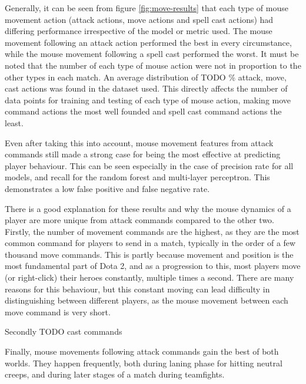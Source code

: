 \documentclass[Report.tex]{subfiles}
\begin{document}
Generally, it can be seen from figure \ref{fig:move-results} that each type of mouse movement action (attack actions, move actions and spell cast actions) had differing performance irrespective of the model or metric used. The mouse movement following an attack action performed the best in every circumstance, while the mouse movement following a spell cast performed the worst. It must be noted that the number of each type of mouse action were not in proportion to the other types in each match. An average distribution of TODO \% attack, move, cast actions was found in the dataset used. This directly affects the number of data points for training and testing of each type of mouse action, making move command actions the most well founded and spell cast command actions the least. 

Even after taking this into account, mouse movement features from attack commands still made a strong case for being the most effective at predicting player behaviour. This can be seen especially in the case of precision rate for all models, and recall for the random forest and multi-layer perceptron. This demonstrates a low false positive and false negative rate. 

There is a good explanation for these results and why the mouse dynamics of a player are more unique from attack commands compared to the other two. Firstly, the number of movement commands are the highest, as they are the most common command for players to send in a match, typically in the order of a few thousand move commands. This is partly because movement and position is the most fundamental part of Dota 2, and as a progression to this, most players move (or right-click) their heroes constantly, multiple times a second. There are many reasons for this behaviour, but this constant moving can lead difficulty in distinguishing between different players, as the mouse movement between each move command is very short. 

Secondly TODO cast commands

Finally, mouse movements following attack commands gain the best of both worlds. They happen frequently, both during laning phase for hitting neutral creeps, and during later stages of a match during teamfights. 
\end{document}
